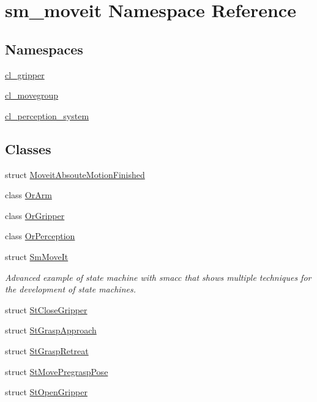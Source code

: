 \hypertarget{namespacesm__moveit}{}\section{sm\+\_\+moveit Namespace Reference}
\label{namespacesm__moveit}
\subsection*{Namespaces}
\begin{DoxyCompactItemize}
\item 
 \hyperlink{namespacesm__moveit_1_1cl__gripper}{cl\+\_\+gripper}
\item 
 \hyperlink{namespacesm__moveit_1_1cl__movegroup}{cl\+\_\+movegroup}
\item 
 \hyperlink{namespacesm__moveit_1_1cl__perception__system}{cl\+\_\+perception\+\_\+system}
\end{DoxyCompactItemize}
\subsection*{Classes}
\begin{DoxyCompactItemize}
\item 
struct \hyperlink{structsm__moveit_1_1MoveitAbsouteMotionFinished}{Moveit\+Absoute\+Motion\+Finished}
\item 
class \hyperlink{classsm__moveit_1_1OrArm}{Or\+Arm}
\item 
class \hyperlink{classsm__moveit_1_1OrGripper}{Or\+Gripper}
\item 
class \hyperlink{classsm__moveit_1_1OrPerception}{Or\+Perception}
\item 
struct \hyperlink{structsm__moveit_1_1SmMoveIt}{Sm\+Move\+It}
\begin{DoxyCompactList}\small\item\em Advanced example of state machine with smacc that shows multiple techniques for the development of state machines. \end{DoxyCompactList}\item 
struct \hyperlink{structsm__moveit_1_1StCloseGripper}{St\+Close\+Gripper}
\item 
struct \hyperlink{structsm__moveit_1_1StGraspApproach}{St\+Grasp\+Approach}
\item 
struct \hyperlink{structsm__moveit_1_1StGraspRetreat}{St\+Grasp\+Retreat}
\item 
struct \hyperlink{structsm__moveit_1_1StMovePregraspPose}{St\+Move\+Pregrasp\+Pose}
\item 
struct \hyperlink{structsm__moveit_1_1StOpenGripper}{St\+Open\+Gripper}
\end{DoxyCompactItemize}
